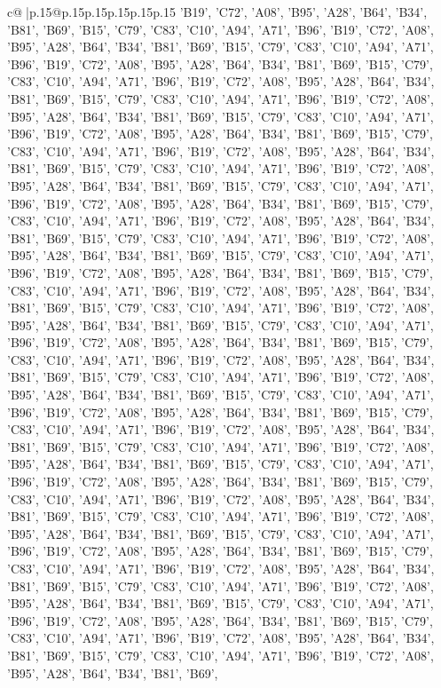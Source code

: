 \documentclass{article}
\begin{document}
{\begin{supertabular}{c@{$\;$}|p{.15\linewidth}@{}p{.15\linewidth}p{.15\linewidth}p{.15\linewidth}p{.15\linewidth}p{.15\linewidth}}
{{{'B19', 'C72', 'A08', 'B95', 'A28', 'B64', 'B34', 'B81', 'B69', 'B15', 'C79', 'C83', 'C10', 'A94', 'A71', 'B96', 'B19', 'C72', 'A08', 'B95', 'A28', 'B64', 'B34', 'B81', 'B69', 'B15', 'C79', 'C83', 'C10', 'A94', 'A71', 'B96', 'B19', 'C72', 'A08', 'B95', 'A28', 'B64', 'B34', 'B81', 'B69', 'B15', 'C79', 'C83', 'C10', 'A94', 'A71', 'B96', 'B19', 'C72', 'A08', 'B95', 'A28', 'B64', 'B34', 'B81', 'B69', 'B15', 'C79', 'C83', 'C10', 'A94', 'A71', 'B96', 'B19', 'C72', 'A08', 'B95', 'A28', 'B64', 'B34', 'B81', 'B69', 'B15', 'C79', 'C83', 'C10', 'A94', 'A71', 'B96', 'B19', 'C72', 'A08', 'B95', 'A28', 'B64', 'B34', 'B81', 'B69', 'B15', 'C79', 'C83', 'C10', 'A94', 'A71', 'B96', 'B19', 'C72', 'A08', 'B95', 'A28', 'B64', 'B34', 'B81', 'B69', 'B15', 'C79', 'C83', 'C10', 'A94', 'A71', 'B96', 'B19', 'C72', 'A08', 'B95', 'A28', 'B64', 'B34', 'B81', 'B69', 'B15', 'C79', 'C83', 'C10', 'A94', 'A71', 'B96', 'B19', 'C72', 'A08', 'B95', 'A28', 'B64', 'B34', 'B81', 'B69', 'B15', 'C79', 'C83', 'C10', 'A94', 'A71', 'B96', 'B19', 'C72', 'A08', 'B95', 'A28', 'B64', 'B34', 'B81', 'B69', 'B15', 'C79', 'C83', 'C10', 'A94', 'A71', 'B96', 'B19', 'C72', 'A08', 'B95', 'A28', 'B64', 'B34', 'B81', 'B69', 'B15', 'C79', 'C83', 'C10', 'A94', 'A71', 'B96', 'B19', 'C72', 'A08', 'B95', 'A28', 'B64', 'B34', 'B81', 'B69', 'B15', 'C79', 'C83', 'C10', 'A94', 'A71', 'B96', 'B19', 'C72', 'A08', 'B95', 'A28', 'B64', 'B34', 'B81', 'B69', 'B15', 'C79', 'C83', 'C10', 'A94', 'A71', 'B96', 'B19', 'C72', 'A08', 'B95', 'A28', 'B64', 'B34', 'B81', 'B69', 'B15', 'C79', 'C83', 'C10', 'A94', 'A71', 'B96', 'B19', 'C72', 'A08', 'B95', 'A28', 'B64', 'B34', 'B81', 'B69', 'B15', 'C79', 'C83', 'C10', 'A94', 'A71', 'B96', 'B19', 'C72', 'A08', 'B95', 'A28', 'B64', 'B34', 'B81', 'B69', 'B15', 'C79', 'C83', 'C10', 'A94', 'A71', 'B96', 'B19', 'C72', 'A08', 'B95', 'A28', 'B64', 'B34', 'B81', 'B69', 'B15', 'C79', 'C83', 'C10', 'A94', 'A71', 'B96', 'B19', 'C72', 'A08', 'B95', 'A28', 'B64', 'B34', 'B81', 'B69', 'B15', 'C79', 'C83', 'C10', 'A94', 'A71', 'B96', 'B19', 'C72', 'A08', 'B95', 'A28', 'B64', 'B34', 'B81', 'B69', 'B15', 'C79', 'C83', 'C10', 'A94', 'A71', 'B96', 'B19', 'C72', 'A08', 'B95', 'A28', 'B64', 'B34', 'B81', 'B69', 'B15', 'C79', 'C83', 'C10', 'A94', 'A71', 'B96', 'B19', 'C72', 'A08', 'B95', 'A28', 'B64', 'B34', 'B81', 'B69', 'B15', 'C79', 'C83', 'C10', 'A94', 'A71', 'B96', 'B19', 'C72', 'A08', 'B95', 'A28', 'B64', 'B34', 'B81', 'B69', 'B15', 'C79', 'C83', 'C10', 'A94', 'A71', 'B96', 'B19', 'C72', 'A08', 'B95', 'A28', 'B64', 'B34', 'B81', 'B69', 'B15', 'C79', 'C83', 'C10', 'A94', 'A71', 'B96', 'B19', 'C72', 'A08', 'B95', 'A28', 'B64', 'B34', 'B81', 'B69', 'B15', 'C79', 'C83', 'C10', 'A94', 'A71', 'B96', 'B19', 'C72', 'A08', 'B95', 'A28', 'B64', 'B34', 'B81', 'B69', 'B15', 'C79', 'C83', 'C10', 'A94', 'A71', 'B96', 'B19', 'C72', 'A08', 'B95', 'A28', 'B64', 'B34', 'B81', 'B69', 'B15', 'C79', 'C83', 'C10', 'A94', 'A71', 'B96', 'B19', 'C72', 'A08', 'B95', 'A28', 'B64', 'B34', 'B81', 'B69', 'B15', 'C79', 'C83', 'C10', 'A94', 'A71', 'B96', 'B19', 'C72', 'A08', 'B95', 'A28', 'B64', 'B34', 'B81', 'B69', 'B15', 'C79', 'C83', 'C10', 'A94', 'A71', 'B96', 'B19', 'C72', 'A08', 'B95', 'A28', 'B64', 'B34', 'B81', 'B69', }}}
\end{supertabular}}
\end{document}
